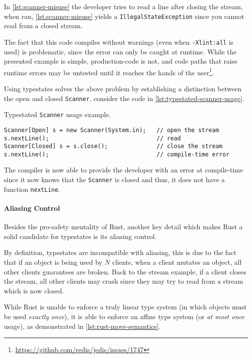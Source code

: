\documentclass[a4paper, 10pt]{article}
\newenvironment{code}{\captionsetup{type=listing}}{}
\begin{document}
In \autoref{lst:scanner-misuse} the developer tries to read a line after closing the stream,
when ran, \autoref{lst:scanner-misuse} yields a \texttt{IllegalStateException} since you cannot read from a closed stream.

The fact that this code compiles without warnings (even when \texttt{-Xlint:all} is used) is problematic,
since the error can only be caught at runtime.
While the presented example is simple, production-code is not,
and code paths that raise runtime errors may be untested until it reaches the hands of the user\footnote{\url{https://github.com/redis/jedis/issues/1747}}.

Using typestates solves the above problem by establishing a distinction between the open and closed \texttt{Scanner},
consider the code in \autoref{lst:typestated-scanner-usage}.

\begin{code}
    \caption{Typestated \texttt{Scanner} usage example.}
    \label{lst:typestated-scanner-usage}
    \begin{verbatim}
Scanner[Open] s = new Scanner(System.in);   // open the stream
s.nextLine();                               // read
Scanner[Closed] s = s.close();              // close the stream
s.nextLine();                               // compile-time error
    \end{verbatim}
\end{code}

The compiler is now able to provide the developer with an error at compile-time
since it now knows that the \texttt{Scanner} is closed and thus,
it does not have a function \texttt{nextLine}.

\paragraph{Aliasing Control}

Besides the pro-safety mentality of Rust,
another key detail which makes Rust a solid candidate for typestates is its aliasing control.

By definition, typestates are incompatible with aliasing,
this is due to the fact that if an object is being used by $N$ clients,
when a client mutates an object, all other clients guarantees are broken.
Back to the stream example, if a client closes the stream,
all other clients may crash since they may try to read from a stream which is now closed.

While Rust is unable to enforce a truly linear type system (in which objects must be used \emph{exactly once}),
it is able to enforce an affine type system (or \emph{at most once} usage), as demonstrated in \autoref{lst:rust-move-semantics}.
\end{document}
